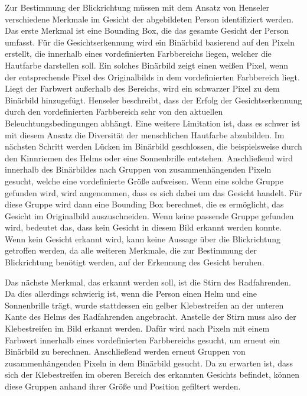 Zur Bestimmung der Blickrichtung müssen mit dem Ansatz von Henseler verschiedene Merkmale im Gesicht der abgebildeten Person identifiziert werden. Das erste Merkmal ist eine Bounding Box, die das gesamte Gesicht der Person umfasst. Für die Gesichtserkennung wird ein Binärbild basierend auf den Pixeln erstellt, die innerhalb eines vordefinierten Farbbereichs liegen, welcher die Hautfarbe darstellen soll. Ein solches Binärbild zeigt einen weißen Pixel, wenn der entsprechende Pixel des Originalbilds in dem vordefinierten Farbbereich liegt. Liegt der Farbwert außerhalb des Bereichs, wird ein schwarzer Pixel zu dem Binärbild hinzugefügt. Henseler beschreibt, dass der Erfolg der Gesichtserkennung durch den vordefinierten Farbbereich sehr von den aktuellen Beleuchtungsbedingungen abhängt. Eine weitere Limitation ist, dass es schwer ist mit diesem Ansatz die Diversität der menschlichen Hautfarbe abzubilden. Im nächsten Schritt werden Lücken im Binärbild geschlossen, die beispielsweise durch den Kinnriemen des Helms oder eine Sonnenbrille entstehen. Anschließend wird innerhalb des Binärbildes nach Gruppen von zusammenhängenden Pixeln gesucht, welche eine vordefinierte Größe aufweisen. Wenn eine solche Gruppe gefunden wird, wird angenommen, dass es sich dabei um das Gesicht handelt. Für diese Gruppe wird dann eine Bounding Box berechnet, die es ermöglicht, das Gesicht im Originalbild auszuschneiden. Wenn keine passende Gruppe gefunden wird, bedeutet das, dass kein Gesicht in diesem Bild erkannt werden konnte. Wenn kein Gesicht erkannt wird, kann keine Aussage über die Blickrichtung getroffen werden, da alle weiteren Merkmale, die zur Bestimmung der Blickrichtung benötigt werden, auf der Erkennung des Gesicht beruhen. 

Das nächste Merkmal, das erkannt werden soll, ist die Stirn des Radfahrenden. Da dies allerdings schwierig ist, wenn die Person einen Helm und eine Sonnenbrille trägt, wurde stattdessen ein gelber Klebestreifen an der unteren Kante des Helms des Radfahrenden angebracht. Anstelle der Stirn muss also der Klebestreifen im Bild erkannt werden. Dafür wird nach Pixeln mit einem Farbwert innerhalb eines vordefinierten Farbbereichs gesucht, um erneut ein Binärbild zu berechnen. Anschließend werden erneut Gruppen von zusammenhängenden Pixeln in dem Binärbild gesucht. Da zu erwarten ist, dass sich der Klebestreifen im oberen Bereich des erkannten Gesichts befindet, können diese Gruppen anhand ihrer Größe und Position gefiltert werden.

